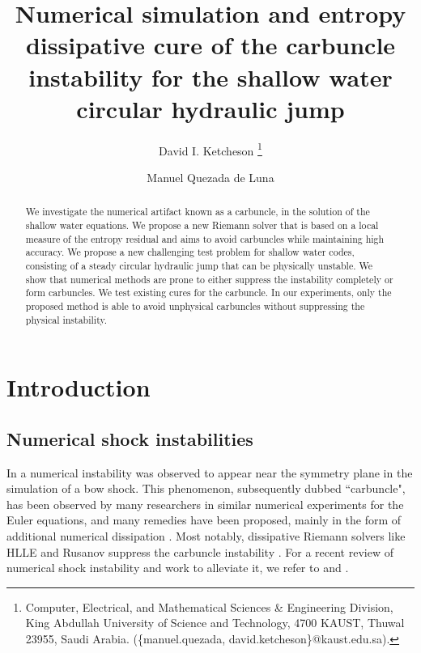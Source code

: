 \documentclass[preprint, 11pt]{article}
\title{Numerical simulation and entropy dissipative cure of the
  carbuncle instability for the shallow water circular hydraulic jump}
\author{
    David I. Ketcheson
  \thanks{
    Computer, Electrical, and Mathematical Sciences \& Engineering Division,
    King Abdullah University of Science and Technology, 4700 KAUST, Thuwal
    23955, Saudi Arabia. (\{manuel.quezada, david.ketcheson\}@kaust.edu.sa).
  }
    \and
    Manuel Quezada de Luna
  \footnotemark[1]
}
\begin{document}
\maketitle

\begin{abstract}
We investigate the numerical artifact known as a carbuncle, in the solution
of the shallow water equations.  We propose a new Riemann solver that is based
on a local measure of the entropy residual and aims to avoid carbuncles while
maintaining high accuracy.
We propose a new challenging test problem for shallow water codes, 
consisting of a steady circular hydraulic
jump that can be physically unstable.  We show that numerical methods are prone to
either suppress the instability completely or form carbuncles.
We test existing cures for the carbuncle. In our experiments, only the proposed
method is able to avoid unphysical carbuncles without suppressing the
physical instability.
\end{abstract}



\section{Introduction}

\subsection{Numerical shock instabilities}

In \cite{peery1988blunt} a numerical instability was observed to
appear near the symmetry plane in the simulation of a bow shock.
This phenomenon, subsequently dubbed ``carbuncle", has been observed by many researchers
in similar numerical experiments for the Euler equations, and many remedies
have been proposed, mainly in the form of additional numerical dissipation
\cite{quirk1997contribution,pandolfi2001numerical,dumbser2004matrix,chauvat2005shock,ismail2009proposed,shen2014stability}.
Most notably, dissipative Riemann solvers like HLLE and Rusanov suppress the carbuncle instability \cite{quirk1997contribution}.
For a recent review of numerical shock instability and work to alleviate it,
we refer to \cite[Section 2.5]{simonnumerical} and \cite{zaide2012numerical}.
\end{document}
